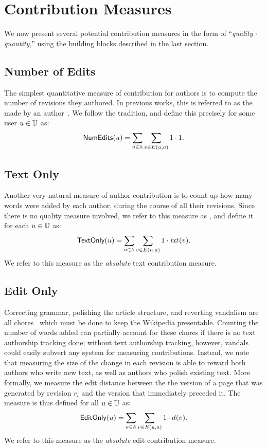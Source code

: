 \section{Contribution Measures}

We now present several potential contribution measures in the form of
``\textit{quality} $\cdot$ \textit{quantity},''
using the building blocks described in the last section.

\subsection{Number of Edits}

\noindent
The simplest quantitative measure of contribution for 
authors is to compute the number of revisions they authored.
In previous works, this is referred to as the 
 made by an 
author~\cite{Wales2005,Wilkinson2007,Kittur2007,SteinHess2007}.
We follow the tradition, and define this precisely
for some user $u \in \mathbb{U}$ as:
%
\[
\numedits(u) = \sum_{a \in \articles} \sum_{v \in E(u, a)} 1 \cdot 1.
\]
%

\subsection{Text Only}

\noindent
Another very natural measure of author contribution
is to count up how many words were added by each author,
during the course of all their revisions.
Since there is no quality measure involved,
we refer to this measure as \textonly,
and define it for each $u \in \mathbb{U}$ as:
%
\[
\textonly(u) = \sum_{a \in \articles} \sum_{v \in E(u, a)} 1 \cdot \txt{}{v}.
\]
%
We refer to this measure as the {\em absolute\/} text contribution
measure.

\subsection{Edit Only}

\noindent
Correcting grammar, polishing the article structure,
and reverting vandalism are all chores~\cite{Burke2008}
which must be done to keep the Wikipedia presentable.
Counting the number of words added can partially account
for these chores if there is no text authorship tracking done;
without text authorship tracking, however, vandals could
easily subvert any system for measuring contributions.
Instead, we note that measuring the size of the change
in each revision is able to reward both authors who write
new text, as well as authors who polish existing text.
More formally, we measure the edit distance between the
the version of a page that was generated by revision $r_i$
and the version that immediately preceded it.
The \editonly measure is thus defined for all $u \in \mathbb{U}$ as:
%
\[
\editonly(u) = \sum_{a \in \articles} \sum_{v \in E(u, a)} 1 \cdot \dist{}{v}.
\]
%
We refer to this measure as the {\em absolute\/} edit contribution
measure.


